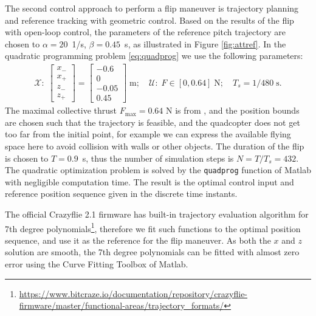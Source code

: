 The second control approach to perform a flip maneuver is trajectory planning and reference tracking with geometric control. Based on the results of the flip with open-loop control, the parameters of the reference pitch trajectory are chosen to $\alpha=20$~1/s, $\beta=0.45$~s, as illustrated in Figure \ref{fig:attref}. In the quadratic programming problem \eqref{eq:quadprog} we use the following parameters:
\begin{align}
    \mathcal{X}:\;\begin{bmatrix} x_- \\ x_+ \\ z_- \\ z_+ \end{bmatrix} =  \begin{bmatrix} -0.6 \\ 0 \\ -0.05 \\ 0.45 \end{bmatrix}\;\mathrm{m};\quad \mathcal{U}:\;F \in [0,0.64]\;\mathrm{N}; \quad T_s = 1/480\;\mathrm{s}.
\end{align}
The maximal collective thrust $F_\mathrm{max}=0.64$ N is from \cite{Forster}, and the position bounds are chosen such that the trajectory is feasible, and the quadcopter does not get too far from the initial point, for example we can express the available flying space here to avoid collision with walls or other objects. The duration of the flip is chosen to $T=0.9$~s, thus the number of simulation steps is $N=T/T_s=432$. The quadratic optimization problem is solved by the \verb+quadprog+ function of Matlab with negligible computation time. The result is the optimal control input and reference position sequence given in the discrete time instants.

The official Crazyflie 2.1 firmware has built-in trajectory evaluation algorithm for 7th degree polynomials\footnote{\url{https://www.bitcraze.io/documentation/repository/crazyflie-firmware/master/functional-areas/trajectory_formats/}}, therefore we fit such functions to the optimal position sequence, and use it as the reference for the flip maneuver. As both the $x$ and $z$ solution are smooth, the 7th degree polynomials can be fitted with almost zero error using the Curve Fitting Toolbox of Matlab\cite{matlabcurvefitting}.

